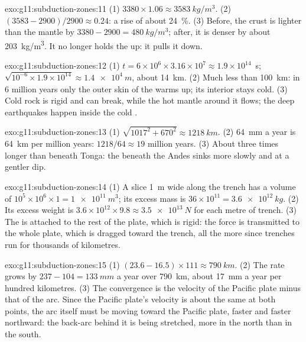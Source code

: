 \begin{solution}{exo:g11:subduction-zones:11}
(1) $3380 \times 1.06 \approx \qty{3583}{kg/m^3}$. (2)
$(3583 - 2900)/2900 \approx 0.24$: a rise of about \qty{24}{\percent}.
(3) Before, the crust is lighter than the mantle by
$3380 - 2900 = \qty{480}{kg/m^3}$; after, it is denser by about
\qty{203}{kg/m^3}. It no longer holds the  up: it pulls it down.
\end{solution}

\begin{solution}{exo:g11:subduction-zones:12}
(1) $t = 6 \times 10^6 \times 3.16 \times 10^7 \approx 1.9 \times 10^{14}$~s;
$\sqrt{10^{-6} \times 1.9 \times 10^{14}} \approx \qty{1.4e4}{m}$, about
\qty{14}{km}. (2) Much less than \qty{100}{km}: in 6 million years only the
outer skin of the  warms up; its interior stays cold. (3) Cold rock is
rigid and can break, while the hot mantle around it flows; the deep
earthquakes happen inside the cold .
\end{solution}

\begin{solution}{exo:g11:subduction-zones:13}
(1) $\sqrt{1017^2 + 670^2} \approx \qty{1218}{km}$. (2) \qty{64}{mm} a year
is \qty{64}{km} per million years: $1218/64 \approx 19$ million years.
(3) About three times longer than beneath Tonga: the  beneath the Andes
sinks more slowly and at a gentler dip.
\end{solution}

\begin{solution}{exo:g11:subduction-zones:14}
(1) A slice \qty{1}{m} wide along the trench has a volume of
$10^5 \times 10^6 \times 1 = \qty{1e11}{m^3}$; its excess mass is
$36 \times 10^{11} = \qty{3.6e12}{kg}$. (2) Its excess weight is
$3.6 \times 10^{12} \times 9.8 \approx \qty{3.5e13}{N}$ for each metre of
trench. (3) The  is attached to the rest of the plate, which is rigid:
the force is transmitted to the whole plate, which is dragged toward the
trench, all the more since trenches run for thousands of kilometres.
\end{solution}

\begin{solution}{exo:g11:subduction-zones:15}
(1) $(23.6 - 16.5) \times 111 \approx \qty{790}{km}$. (2) The rate grows by
$237 - 104 = \qty{133}{mm}$ a year over \qty{790}{km}, about \qty{17}{mm} a
year per hundred kilometres. (3) The convergence is the velocity of the
Pacific plate minus that of the arc. Since the Pacific plate's velocity is
about the same at both points, the arc itself must be moving toward the
Pacific plate, faster and faster northward: the back-arc behind it is being
stretched, more in the north than in the south.
\end{solution}

